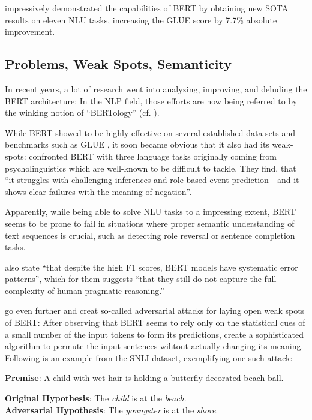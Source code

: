 \citeauthor{devlin2018bert} impressively demonstrated the capabilities of BERT by obtaining
new SOTA results  on eleven NLU tasks, increasing the GLUE score by 7.7\% absolute improvement.



\subsection{Problems, Weak Spots, Semanticity}
\label{sec:problems}

In recent years, a lot of research went into analyzing, improving, and deluding
the BERT architecture; In the NLP field, those efforts are now being referred to by
the winking notion of ``BERTology'' (cf. \cite{rogers2020primer}).

While BERT showed to be highly effective on several established data sets and benchmarks such as
GLUE \citep{wang2018glue}, it soon became obvious that it also {\color{red} had} its weak-spots:
\citeauthor{ettinger2020bert} confronted BERT with three language tasks originally coming from
psycholinguistics which are well-known to be difficult to tackle. They find, that ``it struggles
with challenging inferences and role-based event prediction—and it shows clear failures with the
meaning of negation''.

Apparently, while being able to solve NLU tasks to a impressing extent, BERT seems to be prone
to fail in situations where proper semantic understanding of text sequences is crucial, such as
detecting role reversal or sentence completion tasks.

\cite{jiang2019evaluating} also state ``that despite the high F1 scores, BERT models have
systematic error patterns'', which for them suggests ``that they still do not capture the
full complexity of human pragmatic reasoning.''

\cite{jin2020bert} go even further and creat so-called adversarial attacks for laying open
weak spots of BERT: After observing that BERT seems to rely only on the statistical cues of a
small number of the input tokens to form its predictions, \citeauthor{jin2020bert} create a
sophisticated algorithm to permute the input sentences wihtout actually changing its meaning.
Following is an example from the SNLI \citep{bowman2015snli} dataset, exemplifying one such
attack:

\begin{examples}
  \item \textbf{Premise}: A child with wet hair is holding a butterfly decorated beach ball.

        \textbf{Original Hypothesis}: The \emph{child} is at the \emph{beach}.\\
        \textbf{Adversarial Hypothesis}: The \emph{youngster} is at the \emph{shore}.
\end{examples}

